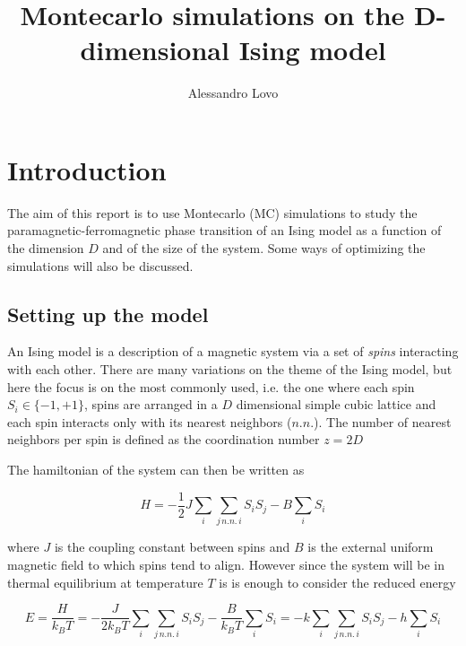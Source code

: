\documentclass[a4paper, 11pt]{article}
\begin{document}
\title{Montecarlo simulations on the D-dimensional Ising model}
\author{Alessandro Lovo}

\maketitle


\section{Introduction}
  The aim of this report is to use Montecarlo (MC) simulations to study the paramagnetic-ferromagnetic phase transition of an Ising model as a function of the dimension $D$ and of the size of the system. Some ways of optimizing the simulations will also be discussed.

  \subsection{Setting up the model}
    An Ising model is a description of a magnetic system via a set of \emph{spins} interacting with each other.
    There are many variations on the theme of the Ising model, but here the focus is on the most commonly used, i.e. the one where each spin $S_i \in \{-1, +1\}$, spins are arranged in a $D$ dimensional simple cubic lattice and each spin interacts only with its nearest neighbors ($n.n.$).
    The number of nearest neighbors per spin is defined as the coordination number $z = 2D$

    The hamiltonian of the system can then be written as

    \begin{equation*}
      H = -\frac{1}{2} J \sum_i \sum_{j \, n.n. \, i} S_i S_j - B \sum_i S_i
    \end{equation*}

    where $J$ is the coupling constant between spins and $B$ is the external uniform magnetic field to which spins tend to align. However since the system will be in thermal equilibrium at temperature $T$ is is enough to consider the reduced energy

    \begin{equation*}
      E = \frac{H}{k_BT} = -\frac{J}{2k_BT}  \sum_i \sum_{j \, n.n. \, i} S_i S_j - \frac{B}{k_BT} \sum_i S_i = -k\sum_i \sum_{j \, n.n. \, i} S_i S_j - h\sum_i S_i
    \end{equation*}
\end{document}
